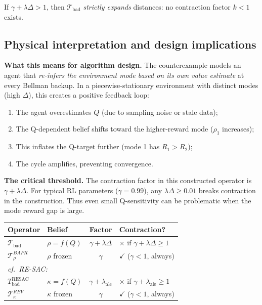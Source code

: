 \begin{theorem}
    \label{thm:expansion}
    If $\gamma + \lambda\Delta > 1$, then $\mathcal{T}_{\text{bad}}$ \emph{strictly expands} distances: no contraction factor $k < 1$ exists.
\end{theorem}

\subsection{Physical interpretation and design implications}

\textbf{What this means for algorithm design.} The counterexample models an agent that \emph{re-infers the environment mode based on its own value estimate} at every Bellman backup. In a piecewise-stationary environment with distinct modes (high $\Delta$), this creates a positive feedback loop:
\begin{enumerate}
    \item The agent overestimates $Q$ (due to sampling noise or stale data);
    \item The Q-dependent belief shifts toward the higher-reward mode ($\rho_1$ increases);
    \item This inflates the Q-target further (mode 1 has $R_1 > R_2$);
    \item The cycle amplifies, preventing convergence.
\end{enumerate}

\textbf{The critical threshold.} The contraction factor in this constructed operator is $\gamma + \lambda\Delta$. For typical RL parameters ($\gamma = 0.99$), any $\lambda\Delta \geq 0.01$ breaks contraction in the construction. Thus even small Q-sensitivity can be problematic when the mode reward gap is large.

\medskip
\begin{center}
\begin{tabular}{llcl}
\toprule
\textbf{Operator} & \textbf{Belief} & \textbf{Factor} & \textbf{Contraction?} \\
\midrule
$\mathcal{T}_{\text{bad}}$ & $\rho = f(Q)$ & $\gamma + \lambda\Delta$ & $\times$ if $\gamma + \lambda\Delta \geq 1$ \\
$\mathcal{T}^{BAPR}_\rho$ & $\rho$ frozen & $\gamma$ & $\checkmark$ ($\gamma < 1$, always) \\
\midrule
\multicolumn{4}{l}{\textit{cf.\ RE-SAC:}} \\
$T_{\text{bad}}^{\text{RESAC}}$ & $\kappa = f(Q)$ & $\gamma + \lambda_{\text{ale}}$ & $\times$ if $\gamma + \lambda_{\text{ale}} \geq 1$ \\
$\mathcal{T}^{REV}_\kappa$ & $\kappa$ frozen & $\gamma$ & $\checkmark$ ($\gamma < 1$, always) \\
\bottomrule
\end{tabular}
\end{center}

